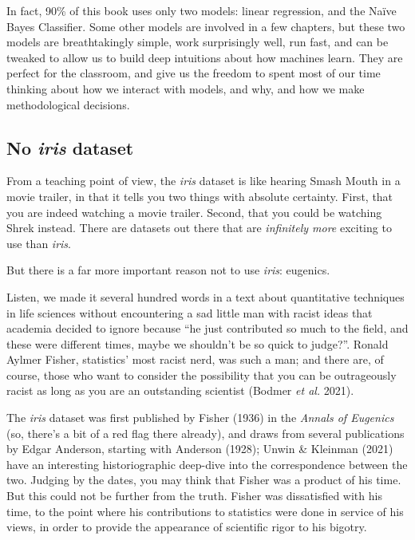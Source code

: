 \documentclass[
  letterpaper,
]{scrbook}
\begin{document}
In fact, 90\% of this book uses only two models: linear regression, and
the Naïve Bayes Classifier. Some other models are involved in a few
chapters, but these two models are breathtakingly simple, work
surprisingly well, run fast, and can be tweaked to allow us to build
deep intuitions about how machines learn. They are perfect for the
classroom, and give us the freedom to spent most of our time thinking
about how we interact with models, and why, and how we make
methodological decisions.

\subsection{\texorpdfstring{No \emph{iris}
dataset}{No iris dataset}}\label{no-iris-dataset}

From a teaching point of view, the \emph{iris} dataset is like hearing
Smash Mouth in a movie trailer, in that it tells you two things with
absolute certainty. First, that you are indeed watching a movie trailer.
Second, that you could be watching Shrek instead. There are datasets out
there that are \emph{infinitely more} exciting to use than \emph{iris}.

But there is a far more important reason not to use \emph{iris}:
eugenics.

Listen, we made it several hundred words in a text about quantitative
techniques in life sciences without encountering a sad little man with
racist ideas that academia decided to ignore because ``he just
contributed so much to the field, and these were different times, maybe
we shouldn't be so quick to judge?''. Ronald Aylmer Fisher, statistics'
most racist nerd, was such a man; and there are, of course, those who
want to consider the possibility that you can be outrageously racist as
long as you are an outstanding scientist (Bodmer \emph{et al.} 2021).

The \emph{iris} dataset was first published by Fisher (1936) in the
\emph{Annals of Eugenics} (so, there's a bit of a red flag there
already), and draws from several publications by Edgar Anderson,
starting with Anderson (1928); Unwin \& Kleinman (2021) have an
interesting historiographic deep-dive into the correspondence between
the two. Judging by the dates, you may think that Fisher was a product
of his time. But this could not be further from the truth. Fisher was
dissatisfied with his time, to the point where his contributions to
statistics were done in service of his views, in order to provide the
appearance of scientific rigor to his bigotry.
\end{document}
